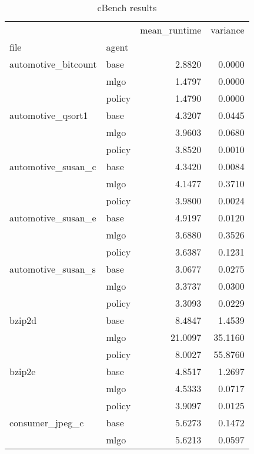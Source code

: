 \begin{table*}
\caption{cBench results}
\label{table:cBench}

\begin{tabular}[t]{llrr}
\toprule
                &        &  mean\_runtime &  variance \\
file & agent &               &           \\
\midrule
automotive\_bitcount & base &        2.8820 &    0.0000 \\
                & mlgo &        1.4797 &    0.0000 \\
                & policy &        1.4790 &    0.0000 \\
automotive\_qsort1 & base &        4.3207 &    0.0445 \\
                & mlgo &        3.9603 &    0.0680 \\
                & policy &        3.8520 &    0.0010 \\
automotive\_susan\_c & base &        4.3420 &    0.0084 \\
                & mlgo &        4.1477 &    0.3710 \\
                & policy &        3.9800 &    0.0024 \\
automotive\_susan\_e & base &        4.9197 &    0.0120 \\
                & mlgo &        3.6880 &    0.3526 \\
                & policy &        3.6387 &    0.1231 \\
automotive\_susan\_s & base &        3.0677 &    0.0275 \\
                & mlgo &        3.3737 &    0.0300 \\
                & policy &        3.3093 &    0.0229 \\
bzip2d & base &        8.4847 &    1.4539 \\
                & mlgo &       21.0097 &   35.1160 \\
                & policy &        8.0027 &   55.8760 \\
bzip2e & base &        4.8517 &    1.2697 \\
                & mlgo &        4.5333 &    0.0717 \\
                & policy &        3.9097 &    0.0125 \\
consumer\_jpeg\_c & base &        5.6273 &    0.1472 \\
                & mlgo &        5.6213 &    0.0597 \\

\end{tabular}
\end{table*}
